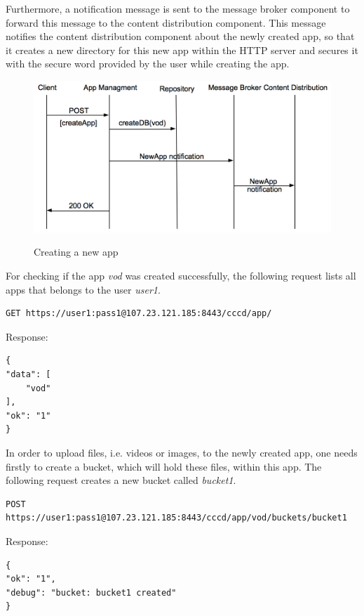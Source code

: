 Furthermore, a notification message is sent to the message broker component to forward this message to the content distribution component. This message notifies the content distribution component about the newly created app, so that it creates a new directory for this new app within the HTTP server and secures it with the secure word provided by the user while creating the app.

\begin{figure}[htb]
  \centering
  \includegraphics[scale=0.6]{flows/newAppFlow.png}\\
  \caption{Creating a new app}
  \label{fig:newApp}
\end{figure}

For checking if the app \textit{vod} was created successfully, the following request lists all apps that belongs to the user \textit{user1}.

\begin{code}
\begin{verbatim}
GET https://user1:pass1@107.23.121.185:8443/cccd/app/
\end{verbatim}
Response:
\begin{verbatim}
{
"data": [
	"vod"
],
"ok": "1"
}
\end{verbatim}
\end{code}
 
In order to upload files, i.e. videos or images, to the newly created app, one needs firstly to create a bucket, which will hold these files, within this app. The following request creates a new bucket called \textit{bucket1}.

\begin{code}
\begin{verbatim}
POST https://user1:pass1@107.23.121.185:8443/cccd/app/vod/buckets/bucket1
\end{verbatim}
Response:
\begin{verbatim}
{
"ok": "1",
"debug": "bucket: bucket1 created"
}
\end{verbatim}
\end{code}

